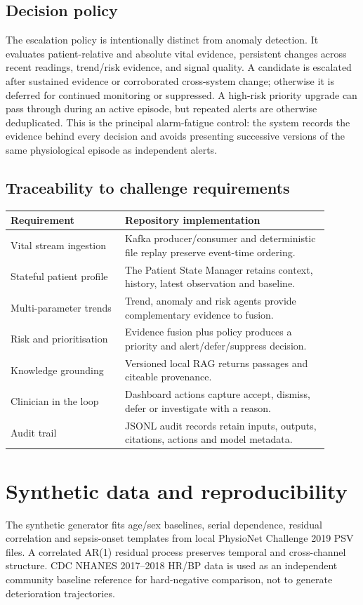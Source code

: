 \documentclass[11pt,a4paper]{article}
\begin{document}
\subsection{Decision policy}
The escalation policy is intentionally distinct from anomaly detection. It evaluates patient-relative and absolute vital evidence, persistent changes across recent readings, trend/risk evidence, and signal quality. A candidate is escalated after sustained evidence or corroborated cross-system change; otherwise it is deferred for continued monitoring or suppressed. A high-risk priority upgrade can pass through during an active episode, but repeated alerts are otherwise deduplicated. This is the principal alarm-fatigue control: the system records the evidence behind every decision and avoids presenting successive versions of the same physiological episode as independent alerts.

\subsection{Traceability to challenge requirements}
\begin{center}
\begin{tabular}{p{0.32\linewidth}p{0.58\linewidth}}
\textbf{Requirement} & \textbf{Repository implementation} \\
\hline
Vital stream ingestion & Kafka producer/consumer and deterministic file replay preserve event-time ordering. \\
Stateful patient profile & The Patient State Manager retains context, history, latest observation and baseline. \\
Multi-parameter trends & Trend, anomaly and risk agents provide complementary evidence to fusion. \\
Risk and prioritisation & Evidence fusion plus policy produces a priority and alert/defer/suppress decision. \\
Knowledge grounding & Versioned local RAG returns passages and citeable provenance. \\
Clinician in the loop & Dashboard actions capture accept, dismiss, defer or investigate with a reason. \\
Audit trail & JSONL audit records retain inputs, outputs, citations, actions and model metadata. \\
\end{tabular}
\end{center}

\section{Synthetic data and reproducibility}
The synthetic generator fits age/sex baselines, serial dependence, residual correlation and sepsis-onset templates from local PhysioNet Challenge 2019 PSV files. A correlated AR(1) residual process preserves temporal and cross-channel structure. CDC NHANES 2017--2018 HR/BP data is used as an independent community baseline reference for hard-negative comparison, not to generate deterioration trajectories.
\end{document}
